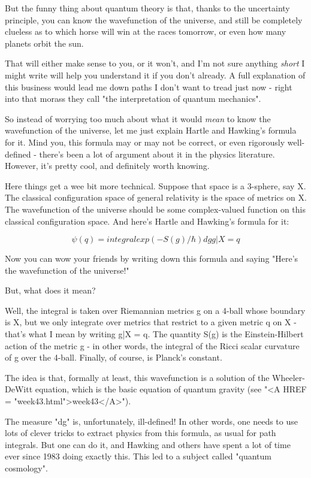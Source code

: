 But the funny thing about quantum theory is that, thanks to the
uncertainty principle, you can know the wavefunction of the universe,
and still be completely clueless as to which horse will win at the
races tomorrow, or even how many planets orbit the sun.  

That will either make sense to you, or it won't, and I'm not sure
anything \emph{short} I might write will help you understand it if you 
don't already.  A full explanation of this business would lead me 
down paths I don't want to tread just now - right into that morass
they call "the interpretation of quantum mechanics".

So instead of worrying too much about what it would \emph{mean} to know the
wavefunction of the universe, let me just explain Hartle and Hawking's
formula for it.  Mind you, this formula may or may not be correct, or 
even rigorously well-defined - there's been a lot of argument about it 
in the physics literature.  However, it's pretty cool, and definitely
worth knowing. 

Here things get a wee bit more technical.  Suppose that space is a 
3-sphere, say X.  The classical configuration space of general relativity 
is the space of metrics on X.  The wavefunction of the universe should 
be some complex-valued function on this classical configuration space.  
And here's Hartle and Hawking's formula for it:


$$

              \psi (q) = integral exp(-S(g)/\hbar ) dg
                       g|X = q

$$
    
Now you can wow your friends by writing down this formula and
saying "Here's the wavefunction of the universe!"  

But, what does it mean? 

Well, the integral is taken over Riemannian metrics g on a 4-ball
whose boundary is X, but we only integrate over metrics that
restrict to a given metric q on X - that's what I mean by writing
g|X = q.  The quantity S(g) is the Einstein-Hilbert action of the 
metric g - in other words, the integral of the Ricci scalar curvature
of g over the 4-ball.  Finally, of course, \hbar  is Planck's constant.

The idea is that, formally at least, this wavefunction is a solution of
the Wheeler-DeWitt equation, which is the basic equation of quantum
gravity (see "<A HREF = "week43.html">week43</A>").

The measure "dg" is, unfortunately, ill-defined!  In other words, one
needs to use lots of clever tricks to extract physics from this formula, 
as usual for path integrals.  But one can do it, and Hawking and others 
have spent a lot of time ever since 1983 doing exactly this.  This led 
to a subject called "quantum cosmology".

